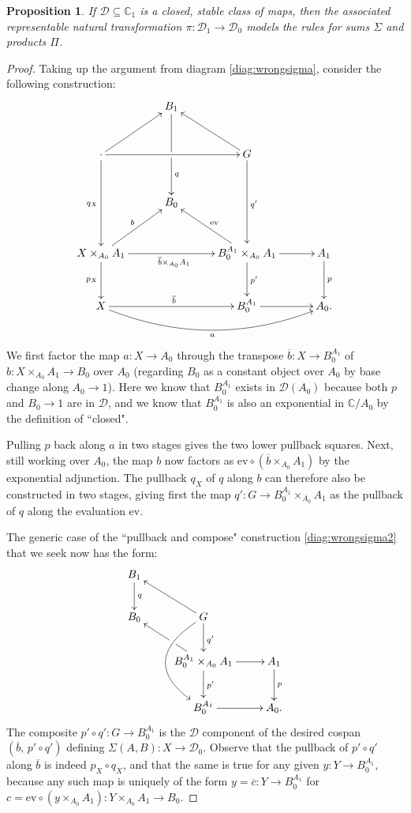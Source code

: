 \documentclass[12pt]{article}
\newcommand{\C}{\ensuremath{\mathbb{C}}}
\newcommand{\D}{\ensuremath{\mathcal{D}}}
\newtheorem{proposition}[theorem]{Proposition}
\theoremstyle{definition}
\begin{document}
\begin{proposition}\label{prop:sumprod}
If $\D\subseteq\C_1$ is a closed, stable class of maps, then the associated representable natural transformation $\pi:\D_1\to\D_0$ models the rules for sums $\Sigma$ and products $\Pi$.
\end{proposition}

\begin{proof}
Taking up the argument from diagram \eqref{diag:wrongsigma}, consider the following construction:  
\begin{equation}\label{genericcase}
\xymatrix@=3em{
& B_1 \ar[dd] |\hole ^>>>>>>>{q} & &\\
\cdot \ar[ru] \ar[dd]_{q_X} \ar[rr] && \ar[lu] G \ar[dd]^{q'} & \\
& B_0 & &\\
X\times_{A_0} A_1\ar[ru]^{b} \ar[d]_{p_X}  \ar[rr]_{\overline{b}\times_{A_0}A_1} && \ar[lu]_{\mathrm{ev}} B_{0}^{A_1} \times_{A_0} A_1 \ar[d]^{p'} \ar[r] & A_1 \ar[d]^{p}\\
X \ar[rr]^{\overline{b}} \ar@/_5ex /[rrr]_{a} && B_0^{A_1} \ar[r]  & A_0.}
\end{equation}
We first factor the map $a: X\to A_0$ through the transpose $\overline{b} : X \to B_{0}^{A_1}$ of $b : X\times_{A_0} A_1\to B_0$ over $A_0$ (regarding $B_0$ as a constant object over $A_0$ by base change along $A_0 \to 1$).  Here we know that $B_{0}^{A_1}$ exists in $\D(A_0)$ because both $p$ and $B_0\to 1$ are  in \D, and we know that $B_{0}^{A_1}$ is also an exponential in $\C/A_0$ by the definition of ``closed".

Pulling $p$ back along $a$ in two stages gives the two lower pullback squares.  Next, still working over $A_0$, the map $b$ now factors as $\mathrm{ev}\circ(\overline{b}\times_{A_0}A_1)$ by the exponential adjunction. 
The pullback $q_X$ of $q$ along $b$ can therefore also be constructed in two stages, giving first the map $q' : G \to B_{0}^{A_1} \times_{A_0} A_1$ as the pullback of $q$ along the evaluation $\mathrm{ev}$. 

The generic case of the  ``pullback and compose" construction \eqref{diag:wrongsigma2} that we seek now has the form:
\[
\xymatrix{
B_1 \ar[d] ^{q} & &\\
B_0 &  \ar[lu]  \ar@/_8ex/ [dd] G \ar[d]^{q'} & \\
& \ar[lu] |<<<<<<\hole B_{0}^{A_1} \times_{A_0} A_1 \ar[d]^{p'} \ar[r] & A_1 \ar[d]^{p}\\
& B_0^{A_1} \ar[r]  & A_0.}
\]
The composite $p'\circ q' : G \to B_0^{A_1}$ is the $\D$ component of the desired cospan $(\overline{b},\, p'\circ q')$ defining $\Sigma(A,B) : X\to \D_0$.  Observe that the pullback of $p'\circ q'$ along $\overline{b}$ is indeed $p_X\circ q_X$, and that the same is true for any given $y : Y\to B_0^{A_1}$, because any such map is uniquely of the form $y=\overline{c} : Y\to B_0^{A_1}$ for $c = \mathrm{ev}\circ(y\times_{A_0}A_1) : Y\times_{A_0} A_1 \to B_0$.  


\end{proof}
\end{document}
